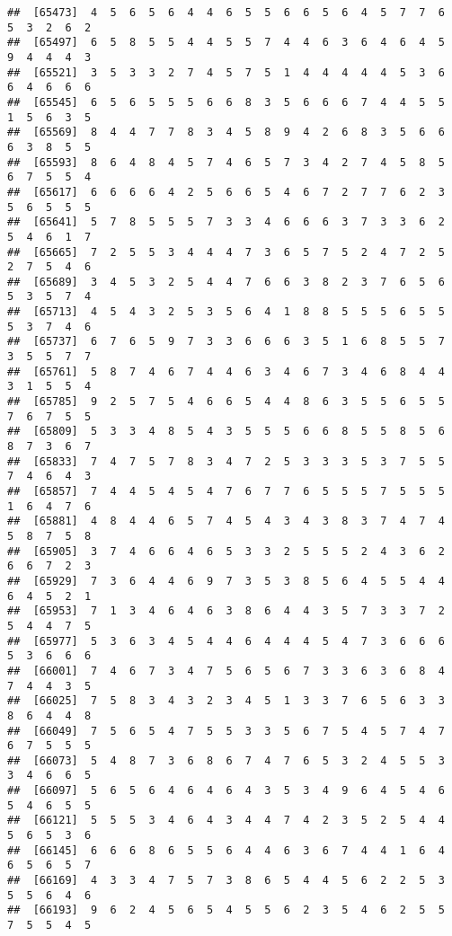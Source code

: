 \documentclass[
]{book}
\begin{document}
\begin{verbatim}
##  [65473]  4  5  6  5  6  4  4  6  5  5  6  6  5  6  4  5  7  7  6  5  3  2  6  2
##  [65497]  6  5  8  5  5  4  4  5  5  7  4  4  6  3  6  4  6  4  5  9  4  4  4  3
##  [65521]  3  5  3  3  2  7  4  5  7  5  1  4  4  4  4  4  5  3  6  6  4  6  6  6
##  [65545]  6  5  6  5  5  5  6  6  8  3  5  6  6  6  7  4  4  5  5  1  5  6  3  5
##  [65569]  8  4  4  7  7  8  3  4  5  8  9  4  2  6  8  3  5  6  6  6  3  8  5  5
##  [65593]  8  6  4  8  4  5  7  4  6  5  7  3  4  2  7  4  5  8  5  6  7  5  5  4
##  [65617]  6  6  6  6  4  2  5  6  6  5  4  6  7  2  7  7  6  2  3  5  6  5  5  5
##  [65641]  5  7  8  5  5  5  7  3  3  4  6  6  6  3  7  3  3  6  2  5  4  6  1  7
##  [65665]  7  2  5  5  3  4  4  4  7  3  6  5  7  5  2  4  7  2  5  2  7  5  4  6
##  [65689]  3  4  5  3  2  5  4  4  7  6  6  3  8  2  3  7  6  5  6  5  3  5  7  4
##  [65713]  4  5  4  3  2  5  3  5  6  4  1  8  8  5  5  5  6  5  5  5  3  7  4  6
##  [65737]  6  7  6  5  9  7  3  3  6  6  6  3  5  1  6  8  5  5  7  3  5  5  7  7
##  [65761]  5  8  7  4  6  7  4  4  6  3  4  6  7  3  4  6  8  4  4  3  1  5  5  4
##  [65785]  9  2  5  7  5  4  6  6  5  4  4  8  6  3  5  5  6  5  5  7  6  7  5  5
##  [65809]  5  3  3  4  8  5  4  3  5  5  5  6  6  8  5  5  8  5  6  8  7  3  6  7
##  [65833]  7  4  7  5  7  8  3  4  7  2  5  3  3  3  5  3  7  5  5  7  4  6  4  3
##  [65857]  7  4  4  5  4  5  4  7  6  7  7  6  5  5  5  7  5  5  5  1  6  4  7  6
##  [65881]  4  8  4  4  6  5  7  4  5  4  3  4  3  8  3  7  4  7  4  5  8  7  5  8
##  [65905]  3  7  4  6  6  4  6  5  3  3  2  5  5  5  2  4  3  6  2  6  6  7  2  3
##  [65929]  7  3  6  4  4  6  9  7  3  5  3  8  5  6  4  5  5  4  4  6  4  5  2  1
##  [65953]  7  1  3  4  6  4  6  3  8  6  4  4  3  5  7  3  3  7  2  5  4  4  7  5
##  [65977]  5  3  6  3  4  5  4  4  6  4  4  4  5  4  7  3  6  6  6  5  3  6  6  6
##  [66001]  7  4  6  7  3  4  7  5  6  5  6  7  3  3  6  3  6  8  4  7  4  4  3  5
##  [66025]  7  5  8  3  4  3  2  3  4  5  1  3  3  7  6  5  6  3  3  8  6  4  4  8
##  [66049]  7  5  6  5  4  7  5  5  3  3  5  6  7  5  4  5  7  4  7  6  7  5  5  5
##  [66073]  5  4  8  7  3  6  8  6  7  4  7  6  5  3  2  4  5  5  3  3  4  6  6  5
##  [66097]  5  6  5  6  4  6  4  6  4  3  5  3  4  9  6  4  5  4  6  5  4  6  5  5
##  [66121]  5  5  5  3  4  6  4  3  4  4  7  4  2  3  5  2  5  4  4  5  6  5  3  6
##  [66145]  6  6  6  8  6  5  5  6  4  4  6  3  6  7  4  4  1  6  4  6  5  6  5  7
##  [66169]  4  3  3  4  7  5  7  3  8  6  5  4  4  5  6  2  2  5  3  5  5  6  4  6
##  [66193]  9  6  2  4  5  6  5  4  5  5  6  2  3  5  4  6  2  5  5  7  5  5  4  5

\end{verbatim}
\end{document}
